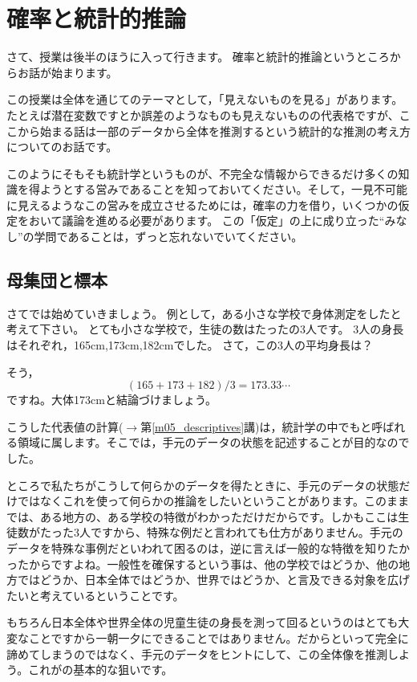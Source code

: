 \documentclass{ltjsbook}
\begin{document}
\chapter{確率と統計的推論}
\label{m16_inference}
さて、授業は後半のほうに入って行きます。
確率と統計的推論というところからお話が始まります。

この授業は全体を通じてのテーマとして，「見えないものを見る」があります。
たとえば潜在変数ですとか誤差のようなものも見えないものの代表格ですが、ここから始まる話は一部のデータから全体を推測するという統計的な推測の考え方についてのお話です。

このようにそもそも統計学というものが、不完全な情報からできるだけ多くの知識を得ようとする営みであることを知っておいてください。そして，一見不可能に見えるようなこの営みを成立させるためには，確率の力を借り，いくつかの仮定をおいて議論を進める必要があります。
この「仮定」の上に成り立った``みなし''の学問であることは，ずっと忘れないでいてください。

\section{母集団と標本}
さてでは始めていきましょう。
例として，ある小さな学校で身体測定をしたと考えて下さい。
とても小さな学校で，生徒の数はたったの3人です。
3人の身長はそれぞれ，165cm,173cm,182cmでした。
さて，この3人の平均身長は？

そう，
\[ (165+173+182)/3=173.33\cdots\]
ですね。大体173cmと結論づけましょう。

こうした代表値の計算($\to$第\ref{m05_descriptives}講)は，統計学の中でもと呼ばれる領域に属します。そこでは，手元のデータの状態を記述することが目的なのでした。

ところで私たちがこうして何らかのデータを得たときに、手元のデータの状態だけではなくこれを使って何らかの推論をしたいということがあります。このままでは、ある地方の、ある学校の特徴がわかっただけだからです。しかもここは生徒数がたった3人ですから、特殊な例だと言われても仕方がありません。手元のデータを特殊な事例だといわれて困るのは，逆に言えば一般的な特徴を知りたかったからですよね。一般性を確保するという事は、他の学校ではどうか、他の地方ではどうか、日本全体ではどうか、世界ではどうか、と言及できる対象を広げたいと考えているということです。

もちろん日本全体や世界全体の児童生徒の身長を測って回るというのはとても大変なことですから一朝一夕にできることではありません。だからといって完全に諦めてしまうのではなく、手元のデータをヒントにして、この全体像を推測しよう。これがの基本的な狙いです。
\end{document}
